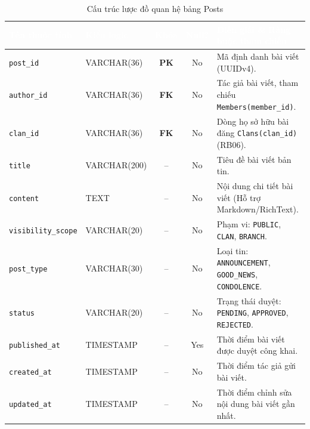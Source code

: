\begin{table}[H]
    \centering
    \small
    \renewcommand{\arraystretch}{1.2}
    \begin{tabularx}{\textwidth}{p{3.2cm} p{2.6cm} c c X}
        \toprule
        \rowcolor{tableheader}\textcolor{white}{\textbf{Tên thuộc tính}} & \textcolor{white}{\textbf{Kiểu logic}} & \textcolor{white}{\textbf{Khóa}} & \textcolor{white}{\textbf{Null?}} & \textcolor{white}{\textbf{Diễn giải \& Ràng buộc tham chiếu}} \\
        \midrule
        \rowcolor{tablerowalt}
        \texttt{post\_id} & VARCHAR(36) & \textcolor{pkcolor}{\textbf{PK}} & No & Mã định danh bài viết (UUIDv4). \\
        \texttt{author\_id} & VARCHAR(36) & \textcolor{fkcolor}{\textbf{FK}} & No & Tác giả bài viết, tham chiếu \texttt{Members(member\_id)}. \\
        \rowcolor{tablerowalt}
        \texttt{clan\_id} & VARCHAR(36) & \textcolor{fkcolor}{\textbf{FK}} & No & Dòng họ sở hữu bài đăng \texttt{Clans(clan\_id)} (RB06). \\
        \texttt{title} & VARCHAR(200) & -- & No & Tiêu đề bài viết bản tin. \\
        \rowcolor{tablerowalt}
        \texttt{content} & TEXT & -- & No & Nội dung chi tiết bài viết (Hỗ trợ Markdown/RichText). \\
        \texttt{visibility\_scope} & VARCHAR(20) & -- & No & Phạm vi: \texttt{PUBLIC}, \texttt{CLAN}, \texttt{BRANCH}. \\
        \rowcolor{tablerowalt}
        \texttt{post\_type} & VARCHAR(30) & -- & No & Loại tin: \texttt{ANNOUNCEMENT}, \texttt{GOOD\_NEWS}, \texttt{CONDOLENCE}. \\
        \texttt{status} & VARCHAR(20) & -- & No & Trạng thái duyệt: \texttt{PENDING}, \texttt{APPROVED}, \texttt{REJECTED}. \\
        \rowcolor{tablerowalt}
        \texttt{published\_at} & TIMESTAMP & -- & Yes & Thời điểm bài viết được duyệt công khai. \\
        \texttt{created\_at} & TIMESTAMP & -- & No & Thời điểm tác giả gửi bài viết. \\
        \rowcolor{tablerowalt}
        \texttt{updated\_at} & TIMESTAMP & -- & No & Thời điểm chỉnh sửa nội dung bài viết gần nhất. \\
        \bottomrule
    \end{tabularx}
    \caption{Cấu trúc lược đồ quan hệ bảng Posts}
    \label{tab:schema_posts}
\end{table}

